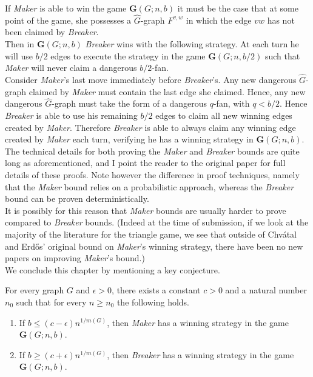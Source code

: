 \documentclass[a4paper,oneside,11pt]{report}
\begin{document}
If \textit{Maker} is able to win the game $\textbf{G}(G;n,b)$ it must be the case that at some point of the game, she possesses a $\hat{G}$-graph $F^{v,w}$ in which the edge $vw$ has not been claimed by \textit{Breaker}.\\

Then in $\textbf{G}(G;n,b)$ \textit{Breaker} wins with the following strategy. At each turn he will use $b/2$ edges to execute the strategy in the game  $\textbf{G}(G;n,b/2)$ such that \textit{Maker} will never claim a dangerous $b/2$-fan.\\

Consider \textit{Maker}'s last move immediately before \textit{Breaker}'s. Any new dangerous $\hat{G}$-graph claimed by \textit{Maker} must contain the last edge she claimed. Hence, any new dangerous $\hat{G}$-graph must take the form of a dangerous $q$-fan, with $q < b/2$. Hence \textit{Breaker} is able to use his remaining $b/2$ edges to claim all new winning edges created by \textit{Maker}. Therefore \textit{Breaker} is able to always claim any winning edge created by \textit{Maker} each turn, verifying he has a winning strategy in $\textbf{G}(G;n,b)$. \\

The technical details for both proving the \textit{Maker} and \textit{Breaker} bounds are quite long as aforementioned, and I point the reader to the original paper for full details of these proofs. Note however the difference in proof techniques, namely that the \textit{Maker} bound relies on a probabilistic approach, whereas the \textit{Breaker} bound can be proven deterministically.\\

It is possibly for this reason that \textit{Maker} bounds are usually harder to prove compared to \textit{Breaker} bounds. (Indeed at the time of submission, if we look at the majority of the literature for the triangle game, we see that outside of Chvátal and Erdős' original bound on \textit{Maker}'s winning strategy, there have been no new papers on improving \textit{Maker}'s bound.)\\

We conclude this chapter by mentioning a key conjecture.

\begin{conjecture}\label{Conjecture}
For every graph $G$ and $\epsilon>0$, there exists a constant $c>0$ and a natural number $n_0$ such that for every $n \geqslant n_0$ the following holds.

\begin{enumerate}
    
    \item If $b \leqslant (c-\epsilon)n^{1/m(G)}$, then \textit{Maker} has a winning strategy in the game $\textbf{G}(G;n,b)$.
    
    \item If $b \geqslant (c+\epsilon)n^{1/m(G)}$, then \textit{Breaker} has a winning strategy in the game $\textbf{G}(G;n,b)$.

\end{enumerate}
\end{conjecture}
\end{document}
